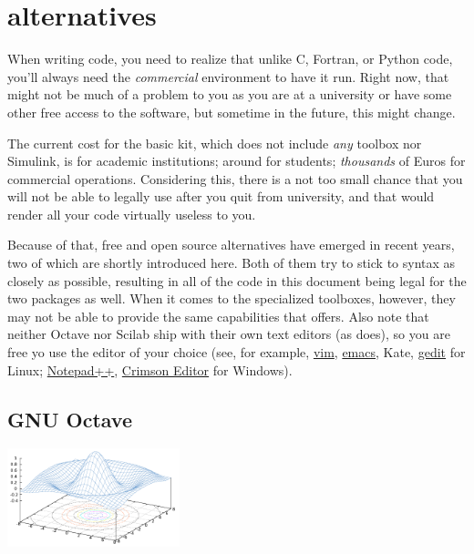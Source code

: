 \newpage
\section*{{\matlab} alternatives}

When writing {\matlab} code, you need to realize that unlike C, Fortran, or Python code, you'll always need the \emph{commercial} {\matlab} environment to have it run. Right now, that might not be much of a problem to you as you are at a university or have some other free access to the software, but sometime in the future, this might change.

The current cost for the basic {\matlab} kit, which does not include \emph{any} toolbox nor Simulink, is  for academic institutions; around  for students; \emph{thousands} of Euros for commercial operations. Considering this, there is a not too small chance that you will not be able to legally use {\matlab} after you quit from university, and that would render all your code virtually useless to you.

Because of that, free and open source {\matlab} alternatives have emerged in recent years, two of which are shortly introduced here. Both of them try to stick to {\matlab} syntax as closely as possible, resulting in all of the code in this document being legal for the two packages as well. When it comes to the specialized toolboxes, however, they may not be able to provide the same capabilities that {\matlab} offers. Also note that neither Octave nor Scilab ship with their own text editors (as {\matlab} does), so you are free yo use the editor of your choice (see, for example, \href{http://www.vim.org/}{vim}, \href{http://www.gnu.org/software/emacs/}{emacs}, Kate, \href{http://projects.gnome.org/gedit/}{gedit} for Linux; \href{http://notepad-plus.sourceforge.net/uk/site.htm}{Notepad++}, \href{http://www.crimsoneditor.com/}{Crimson Editor} for Windows).

\subsection{GNU Octave}

\begin{floatingfigure}[r]{5cm}
\centering
\includegraphics[width=5cm]{figures/Octave_Sombrero}
\end{floatingfigure}

